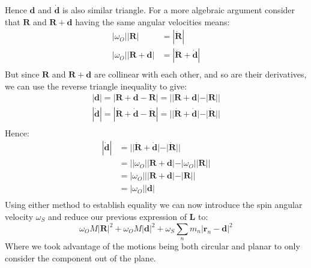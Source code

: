 \begin{center}
\end{center}
Hence $\mathbf{d}$ and $\dot{\mathbf{d}}$ is also similar triangle.
For a more algebraic argument consider that $\mathbf{R}$ and $\mathbf{R+d}$ having the same angular velocities means:
\[\begin{aligned}
	|\omega_O||\mathbf{R}|&=|\dot{\mathbf{R}}| \\
	|\omega_O||\mathbf{R}+\mathbf{d}|&=|\dot{\mathbf{R}}+\dot{\mathbf{d}}| \\
\end{aligned}\]
But since $\mathbf{R}$ and $\mathbf{R+d}$ are collinear with each other,
and so are their derivatives,
we can use the reverse triangle inequality to give:
\[\begin{aligned}
	|\mathbf{d}| = |\mathbf{R+d-R}| = ||\mathbf{R+d}|-|\mathbf{R}||\\
	|\dot{\mathbf{d}}| = |\dot{\mathbf{R}}+\dot{\mathbf{d}}-\dot{\mathbf{R}}| = ||\dot{\mathbf{R}}+\dot{\mathbf{d}}|-|\dot{\mathbf{R}}||\\
\end{aligned}\]
Hence:
\[\begin{aligned}
	|\dot{\mathbf{d}}| 
	&=||\dot{\mathbf{R}}+\dot{\mathbf{d}}|-|\dot{\mathbf{R}}||\\
	&=||\omega_O||\mathbf{R+d}|-|\omega_O||\mathbf{R}||\\
	&=|\omega_O|||\mathbf{R+d}|-|\mathbf{R}||\\
	&=|\omega_O||\mathbf{d}|\\
\end{aligned}\]
Using either method to establish equality we can now introduce the spin angular velocity $\omega_S$ and reduce our previous expression of $\mathbf{L}$ to:
\[\omega_OM|\mathbf{R}|^2+\omega_OM|\mathbf{d}|^2+\omega_S\sum_n m_n|\mathbf{\mathbf{r}}_n-\mathbf{d}|^2\]
Where we took advantage of the motions being both circular and planar to only consider the component out of the plane.
\\


